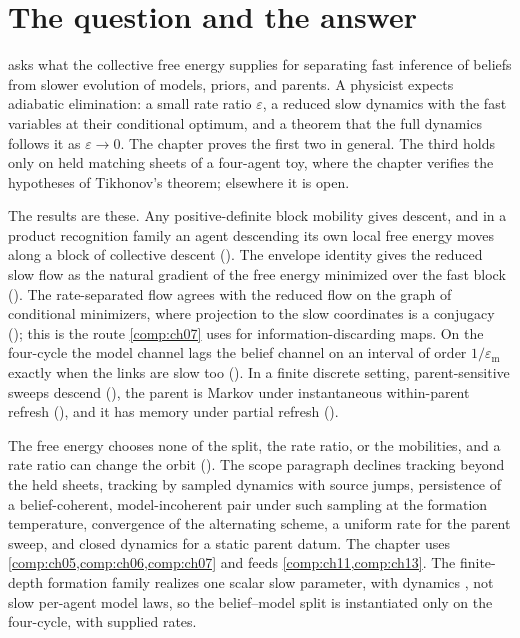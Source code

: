 \section{The question and the answer}
\label{comp:ch08-question}

 asks what the collective free energy supplies for separating fast inference of
beliefs from slower evolution of models, priors, and parents. A physicist expects adiabatic
elimination: a small rate ratio $\varepsilon$, a reduced slow dynamics with the fast variables at
their conditional optimum, and a theorem that the full dynamics follows it as $\varepsilon\to0$. The
chapter proves the first two in general. The third holds only on held matching sheets of a four-agent
toy, where the chapter verifies the hypotheses of Tikhonov's theorem; elsewhere it is open.

The results are these. Any positive-definite block mobility gives descent, and in a product
recognition family an agent descending its own local free energy moves along a block of collective
descent (). The envelope identity gives the reduced slow flow as the
natural gradient of the free energy minimized over the fast block ().
The rate-separated flow agrees with the reduced flow on the graph of conditional minimizers, where
projection to the slow coordinates is a conjugacy (); this is the
route \cref{comp:ch07} uses for information-discarding maps. On the four-cycle the model channel lags
the belief channel on an interval of order $1/\varepsilon_{\mathrm m}$ exactly when the links are slow
too (). In a finite discrete setting, parent-sensitive sweeps
descend (), the parent is Markov under instantaneous
within-parent refresh (), and it has memory under partial refresh
().

The free energy chooses none of the split, the rate ratio, or the mobilities, and a rate ratio can
change the orbit (). The scope paragraph declines tracking beyond
the held sheets, tracking by sampled dynamics with source jumps, persistence of a belief-coherent,
model-incoherent pair under such sampling at the formation temperature, convergence of the alternating
scheme, a uniform rate for the parent sweep, and closed dynamics for a static parent datum. The chapter
uses \cref{comp:ch05,comp:ch06,comp:ch07} and feeds \cref{comp:ch11,comp:ch13}. The finite-depth
formation family realizes one scalar slow parameter, with dynamics
, not slow per-agent model laws, so the belief--model split is
instantiated only on the four-cycle, with supplied rates.


